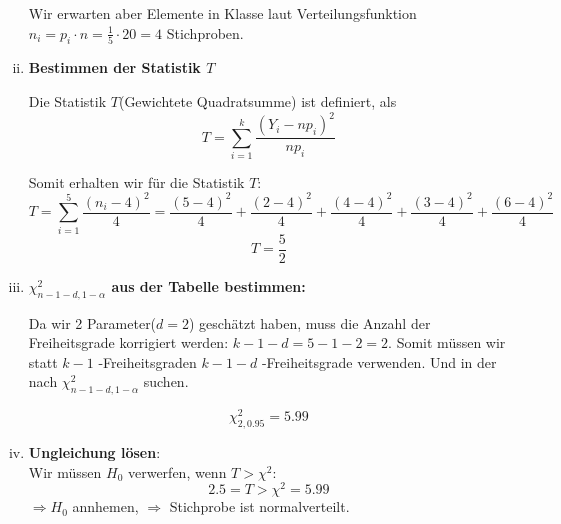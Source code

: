 \begin{uebsp}
\begin{Answer}
\begin{enumerate}[i)]
Wir erwarten aber Elemente in Klasse laut Verteilungsfunktion\\
$n_i=p_i\cdot n=\frac{1}{5}\cdot 20=4$
Stichproben.

\item \textbf{Bestimmen der Statistik $T$}
\begin{uebsp_theory}
Die Statistik $T$(Gewichtete Quadratsumme) ist definiert, als
\[T=\sum_{i=1}^k\frac{(Y_i-np_i)^2}{np_i}\]
\end{uebsp_theory}
Somit erhalten wir für die Statistik $T:$\\
\[T=\sum_{i=1}^5\frac{(n_i-4)^2}{4}=\frac{(5-4)^2}{4}+\frac{(2-4)^2}{4}+\frac{(4-4)^2}{4}+\frac{(3-4)^2}{4}+\frac{(6-4)^2}{4}\]
\[T=\frac{5}{2}\]

\item \textbf{$\chi^2_{n-1-d,1-\alpha}$ aus der Tabelle bestimmen:}
\begin{uebsp_theory}
Da wir 2 Parameter($d=2$) geschätzt haben, muss die Anzahl der Freiheitsgrade korrigiert werden: $k-1-d=5-1-2=2$.
Somit müssen wir statt $k-1$ -Freiheitsgraden $k-1-d$ -Freiheitsgrade verwenden. Und in der  nach $\chi^2_{n-1-d,1-\alpha}$ suchen.
\end{uebsp_theory}
\[\chi^2_{2,0.95}=5.99\]

\item \textbf{Ungleichung lösen}:\\
Wir müssen $H_0$ verwerfen, wenn $T>\chi^2$:
\[2.5=T>\chi^2=5.99\]
$\Rightarrow H_0$ annhemen, $\Rightarrow$ Stichprobe ist normalverteilt.
\end{enumerate}
\end{Answer}
\end{uebsp}
